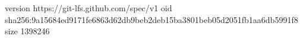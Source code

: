 version https://git-lfs.github.com/spec/v1
oid sha256:9a15684ed9171fe6863d62db9beb2deb15ba3801beb05d2051fb1aa6db5991f8
size 1398246
